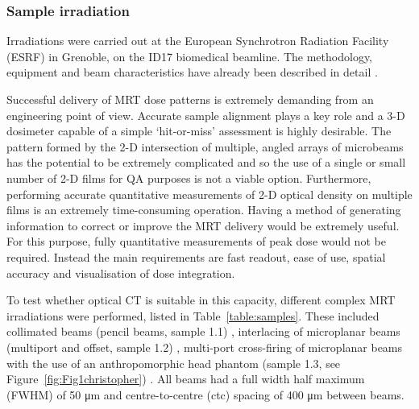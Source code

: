 	
\subsubsection{Sample irradiation}
	
	Irradiations were carried out at the European Synchrotron Radiation Facility (ESRF) in Grenoble, on the ID17 biomedical beamline. The methodology, equipment and beam characteristics have already been described in detail \cite{abdulrahmansophisticated2011 , doranestablishing2013 , doranan2010}. %
	
	Successful delivery of MRT dose patterns is extremely demanding from an engineering point of view. Accurate sample alignment plays a key role and a 3-D dosimeter capable of a simple `hit-or-miss' assessment is highly desirable. The pattern formed by the 2-D intersection of multiple, angled arrays of microbeams has the potential to be extremely complicated and so the use of a single or small number of 2-D films for QA purposes is not a viable option. Furthermore, performing accurate quantitative measurements of 2-D optical density on multiple films is an extremely time-consuming operation. Having a method of generating information to correct or improve the MRT delivery would be extremely useful. For this purpose, fully quantitative measurements of peak dose would not be required. Instead the main requirements are fast readout, ease of use, spatial accuracy and visualisation of dose integration. 
	
	To test whether optical CT is suitable in this capacity, different complex MRT irradiations were performed, listed in Table~\ref{table:samples}. These included collimated beams (pencil beams, sample 1.1) \cite{brauer-krischeffects2010}, interlacing of microplanar beams (multiport and offset, sample 1.2) \cite{serduchigh-precision2010}, multi-port cross-firing of microplanar beams with the use of an anthropomorphic head phantom (sample 1.3, see Figure~\ref{fig:Fig1christopher}) \cite{requardt2005new}. All beams had a full width half maximum (FWHM) of 50 \si{\um} and centre-to-centre (ctc) spacing of 400 \si{\um} between beams.
	
